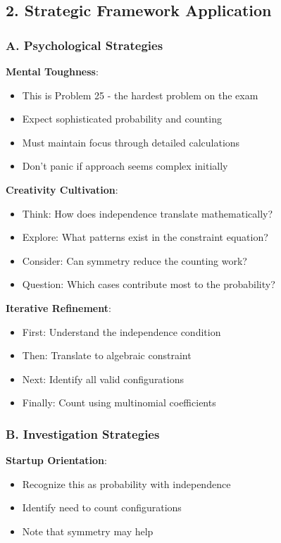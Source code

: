 \documentclass[12pt]{article}
\begin{document}
\begin{strategicbox}
\subsection*{2. Strategic Framework Application}

\subsubsection*{A. Psychological Strategies}

\textbf{Mental Toughness}:
\begin{itemize}
    \item This is Problem 25 - the hardest problem on the exam
    \item Expect sophisticated probability and counting
    \item Must maintain focus through detailed calculations
    \item Don't panic if approach seems complex initially
\end{itemize}

\textbf{Creativity Cultivation}:
\begin{itemize}
    \item Think: How does independence translate mathematically?
    \item Explore: What patterns exist in the constraint equation?
    \item Consider: Can symmetry reduce the counting work?
    \item Question: Which cases contribute most to the probability?
\end{itemize}

\textbf{Iterative Refinement}:
\begin{itemize}
    \item First: Understand the independence condition
    \item Then: Translate to algebraic constraint
    \item Next: Identify all valid configurations
    \item Finally: Count using multinomial coefficients
\end{itemize}

\subsubsection*{B. Investigation Strategies}

\textbf{Startup Orientation}:
\begin{itemize}
    \item Recognize this as probability with independence
    \item Identify need to count configurations
    \item Note that symmetry may help
\end{itemize}


\end{strategicbox}
\end{document}
